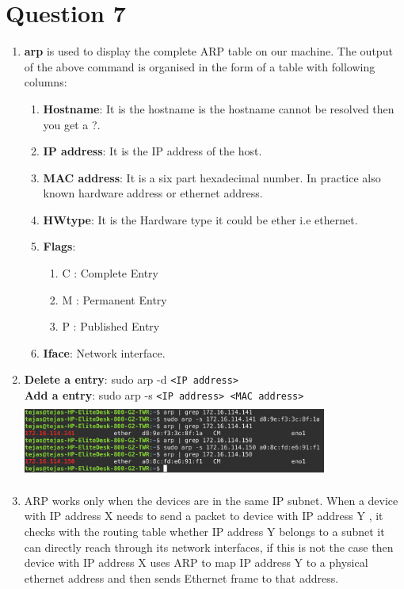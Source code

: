 \documentclass[a4paper,11pt]{article}
\begin{document}
\section*{Question 7}
\begin{enumerate}[itemsep=-3pt,label=(\alph*)]
	\item \textbf{arp} is used to display the complete ARP table on our machine.
	The output of the above command is organised in the form of a table with following columns:\vspace{-2mm}
	\begin{enumerate}[itemsep=0pt,label=(\roman*)]
		\item \textbf{Hostname}: It is the hostname is the hostname cannot be resolved then you get a ?.
		\item \textbf{IP address}: It is the IP address of the host.
		\item \textbf{MAC address}: It is a six part hexadecimal number. In practice also known hardware address or ethernet address.
		\item \textbf{HWtype}: It is the Hardware type it could be ether i.e ethernet.
		\item \textbf{Flags}:\vspace{-1mm}
		\begin{enumerate}[itemsep=0pt,label=(\arabic*)]
			\item C : Complete Entry
			\item M : Permanent Entry
			\item P : Published Entry
		\end{enumerate}\vspace{0mm} 
	    \item \textbf{Iface}: Network interface.
	\end{enumerate}
    \item \textbf{Delete a entry}: sudo arp -d \verb|<IP address>|\\
    \textbf{Add a entry}: sudo arp -s \verb|<IP address> <MAC address>|
	\\ \includegraphics[height=25mm,width=100mm]{arp}
	\item ARP works only when the devices are in the same IP subnet.
	When a device with IP address X needs to send a packet to device with IP address Y , it checks with the routing table whether IP address Y belongs to a subnet it can directly reach through its network interfaces, if this is not the case then device with IP address X uses ARP to map IP address Y to a physical ethernet address and then sends Ethernet frame to that address.\\

\end{enumerate}
\end{document}
